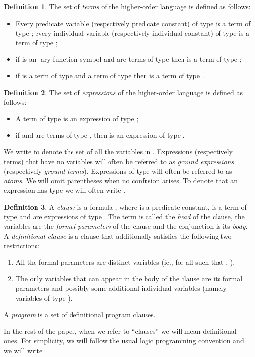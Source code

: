 \documentclass[submission,copyright]{eptcs}
\theoremstyle{definition}
\newtheorem{definition}{Definition}
\begin{document}
\begin{definition}
The set of {\em terms} of the higher-order language  is defined as follows:
\begin{itemize}
  \item Every predicate variable (respectively predicate constant) of type  is a
        term of type ; every individual variable (respectively individual constant)
        of type  is a term of type ;
  \item if  is an -ary function symbol and 
        are terms of type  then  is
        a term of type ;
  \item if  is a term of type  and
         a term of type  then  is a term of type .
\end{itemize}
\end{definition}
\begin{definition}
The set of {\em expressions} of the higher-order language  is defined as follows:
\begin{itemize}
\item A term of type  is an expression of type ;
\item if  and  are terms of type , then  is an expression of type .
\end{itemize}
\end{definition}
We write  to denote the set of all the variables in .
Expressions (respectively terms) that have no variables will often be referred to as {\em ground expressions} (respectively {\em ground terms}). Expressions of type  will often be referred to as {\em atoms}. We will omit parentheses
when no confusion arises. To denote that an expression  has type  we will often write .

\begin{definition}
A {\em clause} is a formula ,
where  is a predicate constant, 
is a term of type  and  are expressions
of type . The term  is called the {\em head} of the
clause, the variables  are the {\em formal parameters} of the
clause and the conjunction  is its {\em body}.
A {\em definitional clause} is a clause that additionally satisfies the following
two restrictions:
\begin{enumerate}
\item All the formal parameters are distinct variables (ie., for all  such that ,
      ).

\item The only variables that can appear in the body of the clause are its formal parameters
      and possibly some additional individual variables (namely variables of type ).
\end{enumerate}
A {\em program}  is a set of definitional program clauses.
\end{definition}
In the rest of the paper, when we refer to ``clauses'' we will mean definitional ones.
For simplicity, we will follow the usual logic programming convention and we will write
\end{document}
